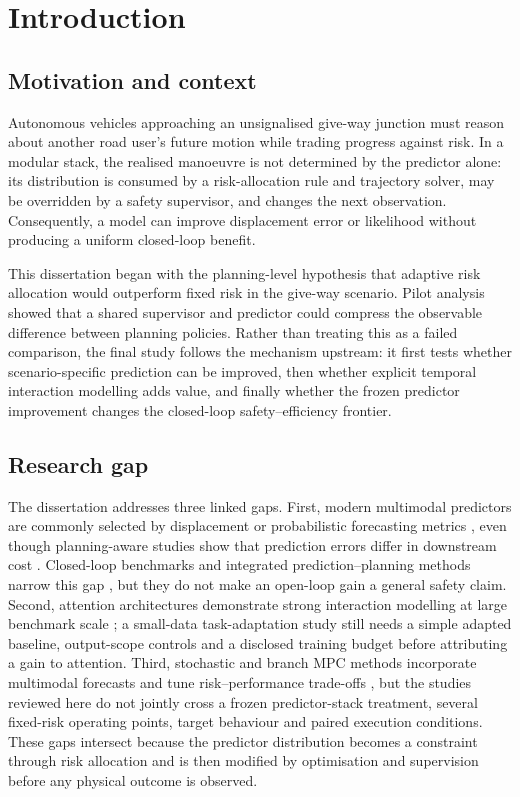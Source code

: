 \section{Introduction}
\label{sec:introduction}

\subsection{Motivation and context}

Autonomous vehicles approaching an unsignalised give-way junction must reason
about another road user's future motion while trading progress against risk.
In a modular stack, the realised manoeuvre is not determined by the predictor
alone: its distribution is consumed by a risk-allocation rule and trajectory
solver, may be overridden by a safety supervisor, and changes the next
observation. Consequently, a model can improve displacement error or
likelihood without producing a uniform closed-loop benefit.

This dissertation began with the planning-level hypothesis that adaptive risk
allocation would outperform fixed risk in the give-way scenario. Pilot
analysis showed that a shared supervisor and predictor could compress the
observable difference between planning policies. Rather than treating this as
a failed comparison, the final study follows the mechanism upstream: it first
tests whether scenario-specific prediction can be improved, then whether
explicit temporal interaction modelling adds value, and finally whether the
frozen predictor improvement changes the closed-loop safety--efficiency
frontier.

\subsection{Research gap}

The dissertation addresses three linked gaps. First, modern multimodal
predictors are commonly selected by displacement or probabilistic forecasting
metrics \citep{chai2020multipath,shi2022mtr,nayakanti2023wayformer}, even though
planning-aware studies show that prediction errors differ in downstream cost
\citep{farid2023task,nakamura2025regret}. Closed-loop benchmarks and integrated
prediction--planning methods narrow this gap
\citep{caesar2021nuplan,huang2023dipp}, but they do not make an open-loop gain a
general safety claim. Second, attention architectures demonstrate strong
interaction modelling at large benchmark scale
\citep{yuan2021agentformer,ngiam2022scene}; a small-data task-adaptation study
still needs a simple adapted baseline, output-scope controls and a disclosed
training budget before attributing a gain to attention. Third, stochastic and
branch MPC methods incorporate multimodal forecasts and tune risk--performance
trade-offs \citep{nair2022smpc,chen2022branch,nair2025predictive}, but the
studies reviewed here do not jointly cross a frozen predictor-stack treatment,
several fixed-risk operating points, target behaviour and paired execution
conditions. These gaps intersect because the predictor distribution becomes a
constraint through risk allocation and is then modified by optimisation and
supervision before any physical outcome is observed.


